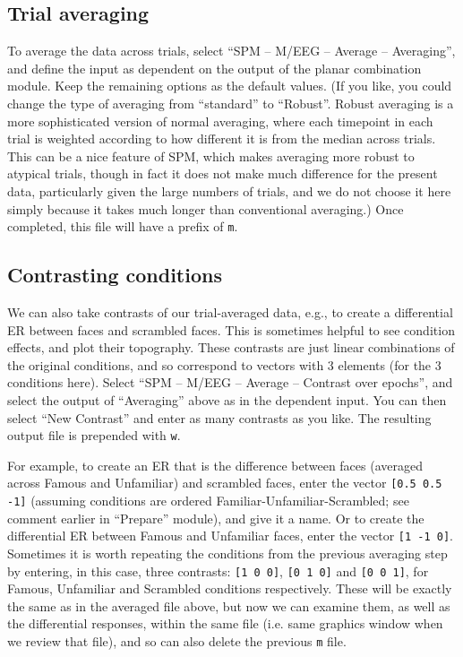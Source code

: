 \subsection{Trial averaging}

To average the data across trials, select ``SPM -- M/EEG -- Average -- Averaging'', and define the input as dependent on the output of the planar combination module. Keep the remaining options as the default values. (If you like, you could change the type of averaging from ``standard'' to ``Robust''. Robust averaging is a more sophisticated version of normal averaging, where each timepoint in each trial is weighted according to how different it is from the median across trials. This can be a nice feature of SPM, which makes averaging more robust to atypical trials, though in fact it does not make much difference for the present data, particularly given the large numbers of trials, and we do not choose it here simply because it takes much longer than conventional averaging.) Once completed, this file will have a prefix of \texttt{m}.

\subsection{Contrasting conditions}

We can also take contrasts of our trial-averaged data, e.g., to create a differential ER between faces and scrambled faces. This is sometimes helpful to see condition effects, and plot their topography. These contrasts are just linear combinations of the original conditions, and so correspond to vectors with 3 elements (for the 3 conditions here). Select ``SPM -- M/EEG -- Average -- Contrast over epochs'', and select the output of ``Averaging'' above as in the dependent input. You can then select ``New Contrast'' and enter as many contrasts as you like. The resulting output file is prepended with \texttt{w}.

For example, to create an ER that is the difference between faces (averaged across Famous and Unfamiliar) and scrambled faces, enter the vector \verb|[0.5 0.5 -1]| (assuming conditions are ordered Familiar-Unfamiliar-Scrambled; see comment earlier in ``Prepare'' module), and give it a name. Or to create the differential ER between Famous and Unfamiliar faces, enter the vector \verb|[1 -1 0]|. Sometimes it is worth repeating the conditions from the previous averaging step by entering, in this case, three contrasts: \verb|[1 0 0]|, \verb|[0 1 0]| and \verb|[0 0 1]|, for Famous, Unfamiliar and Scrambled conditions respectively. These will be exactly the same as in the averaged file above, but now we can examine them, as well as the differential responses, within the same file (i.e. same graphics window when we review that file), and so can also delete the previous \texttt{m} file.

